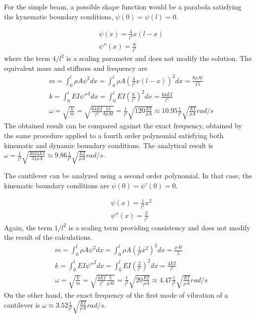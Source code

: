 \documentclass{problems}
\begin{document}
\parbox{.7\textwidth}{For the simple beam, a possible shape function would be a parabola satisfying the kynematic boundary conditions, $\psi(0) = \psi(l) = 0$.} \hspace{1em}
\parbox{.25\textwidth}{}
\begin{align*}
&\psi(x) = \frac{4}{l^2} x (l-x) \\
&\psi''(x) = \frac{8}{l^2}
\end{align*}
where the term $4/l^2$ is a scaling parameter and does not modify the solution. The equivalent mass and stiffness and frequency are
\begin{align*}
&m = \int_0^l \rho A\psi^2dx = \int_0^l \rho A \left(\frac{4}{l^2} x (l-x)\right)^2dx = \frac{8\rho Al}{15} \\
&k = \int_0^l EI \psi''^2 dx = \int_0^l EI \left(\frac{8}{l^2}\right)^2dx = \frac{64EI}{l^3} \\
&\omega = \sqrt{\frac{k}{m}} = \sqrt{\frac{64EI}{l^3}\frac{15}{8\rho Al}} = \frac{1}{l^2}\sqrt{120\frac{EI}{\rho A}} \approx 10.95\frac{1}{l^2}\sqrt{\frac{EI}{\rho A}} rad/s
\end{align*}
The obtained result can be compared against the exact frequency, obtained by the same procedure applied to a fourth order polynomial satisfying both kinematic and dynamic boundary conditions. The analytical result is $\omega = \frac{1}{l^2}\sqrt{\frac{3024EI}{31\rho A}} \approx 9.86\frac{1}{l^2}\sqrt{\frac{EI}{\rho A}} rad/s$.

\parbox{.7\textwidth}{The cantilever can be analyzed using a second order polynomial. In that case, the kinematic boundary conditions are $\psi(0) = \psi'(0) = 0$.} \hspace{1em}
\parbox{.25\textwidth}{}
\begin{align*}
&\psi(x) = \frac{1}{l^2} x^2 \\
&\psi''(x) = \frac{2}{l^2}
\end{align*}
Again, the term $1/l^2$ is a scaling term providing consistency and does not modify the result of the calculations.
\begin{align*}
&m = \int_0^l \rho A\psi^2dx = \int_0^l \rho A \left(\frac{1}{l^2} x^2\right)^2dx = \frac{\rho Al}{5} \\
&k = \int_0^l EI \psi''^2 dx = \int_0^l EI \left(\frac{2}{l^2}\right)^2dx = \frac{4EI}{l^3} \\
&\omega = \sqrt{\frac{k}{m}} = \sqrt{\frac{4EI}{l^3}\frac{5}{\rho Al}} = \frac{1}{l^2}\sqrt{20\frac{EI}{\rho A}} \approx 4.47\frac{1}{l^2}\sqrt{\frac{EI}{\rho A}} rad/s
\end{align*}
On the other hand, the exact frequency of the first mode of vibration of a cantilever is $\omega\approx3.52\frac{1}{l^2}\sqrt{\frac{EI}{\rho A}}rad/s$.
\end{document}
